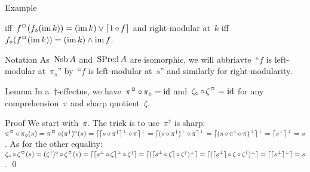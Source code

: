 \documentclass[b]{subfiles}
\begin{document}
\begin{parsec}
\begin{point}{Example}
\begin{enumerate}
            iff~$f^\BOX (f_\diamond ( \IM k)) = 
                (\IM k) \vee \ceil{1 \after f}$
        and right-modular at~$k$
            iff~$f_\diamond (f^\BOX ( \IM k)) = 
                (\IM k) \wedge \IM f$.
\end{enumerate}
\begin{point}{Notation}%
As~$\operatorname{Nsb} A$ and~$\operatorname{SPred} A$ are isomorphic,
    we will abbriavte~``$f$ is left-modular at~$\pi_s$''
    by~``$f$ is left-modular at~$s$''
    and similarly for right-modularity.
\end{point}
\end{point}
\begin{point}[diamondboxlemma]{Lemma}%
In a~$\dagger$-effectus,
    we have~$\pi^\BOX \after \pi_\diamond = \id$
    and~$\zeta_\diamond \after \zeta^\BOX = \id$
    for any comprehension~$\pi$
    and sharp quotient~$\zeta$.
\begin{point}{Proof}%
We start with~$\pi$.  The trick is to use~$\pi^\dagger$ is sharp:
    $\pi^\BOX \after \pi_\diamond (s) =
    \pi^\BOX \after (\pi^\dagger)^\diamond (s) =
    \lceil \lceil s \after \pi^\dagger \rceil^\perp \after \pi\rceil^\perp =
    \lceil(s \after \pi^\dagger)^\perp \after \pi\rceil^\perp =
    \lceil(s \after \pi^\dagger \after \pi)^\perp\rceil^\perp =
    \lceil s ^\perp\rceil^\perp = s $.
As for the other equality:
    $\zeta_\diamond \after \zeta^\BOX (s)
        = (\zeta^\dagger)^\diamond \after \zeta^\BOX (s)
        = \lceil\lceil s^\perp \after  \zeta \rceil^\perp \after \zeta^\dagger\rceil
        = \lceil(\lceil s^\perp \after  \zeta \rceil \after \zeta^\dagger)^\perp\rceil
        = \lceil(\lceil s^\perp\rceil \after \zeta \after \zeta^\dagger)^\perp\rceil
        = \lceil \lceil s^\perp\rceil^\perp \rceil = s $. \qed
\end{point}
\end{point}
\end{parsec}
\end{document}
